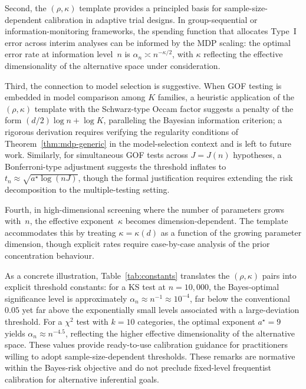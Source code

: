\documentclass[11pt]{article}
\newcommand{\rhotail}{\rho}  %
\newcommand{\1}{\mathbf{1}}
\theoremstyle{plain}
\theoremstyle{definition}
\theoremstyle{remark}
\begin{document}
Second, the $(\rhotail,\kappa)$ template provides a principled basis for sample-size-dependent calibration in adaptive trial designs.
In group-sequential or information-monitoring frameworks, the spending function that allocates Type~I error across interim analyses can be informed by the MDP scaling: the optimal error rate at information level~$n$ is $\alpha_n\asymp n^{-\kappa/2}$, with $\kappa$ reflecting the effective dimensionality of the alternative space under consideration.

Third, the connection to model selection is suggestive.
When GOF testing is embedded in model comparison among $K$ families, a heuristic application of the $(\rhotail,\kappa)$ template with the Schwarz-type Occam factor \citep{Schwarz1978} suggests a penalty of the form $(d/2)\log n+\log K$, paralleling the Bayesian information criterion; a rigorous derivation requires verifying the regularity conditions of Theorem~\ref{thm:mdp-generic} in the model-selection context and is left to future work.
Similarly, for simultaneous GOF tests across $J=J(n)$ hypotheses, a Bonferroni-type adjustment suggests the threshold inflates to $t_n\approx\sqrt{a^{\star}\log(nJ)}$, though the formal justification requires extending the risk decomposition to the multiple-testing setting.

Fourth, in high-dimensional screening where the number of parameters grows with~$n$, the effective exponent~$\kappa$ becomes dimension-dependent.
The template accommodates this by treating $\kappa=\kappa(d)$ as a function of the growing parameter dimension, though explicit rates require case-by-case analysis of the prior concentration behaviour.

As a concrete illustration, Table~\ref{tab:constants} translates the $(\rhotail,\kappa)$ pairs into explicit threshold constants: for a KS test at $n=10{,}000$, the Bayes-optimal significance level is approximately $\alpha_n\approx n^{-1}\approx 10^{-4}$, far below the conventional $0.05$ yet far above the exponentially small levels associated with a large-deviation threshold.
For a $\chi^2$ test with $k=10$ categories, the optimal exponent $a^{\star}=9$ yields $\alpha_n\approx n^{-4.5}$, reflecting the higher effective dimensionality of the alternative space.
These values provide ready-to-use calibration guidance for practitioners willing to adopt sample-size-dependent thresholds.
These remarks are normative within the Bayes-risk objective and do not preclude fixed-level frequentist calibration for alternative inferential goals.
\end{document}
